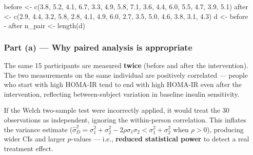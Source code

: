 \documentclass[
  letterpaper,
  DIV=11,
  numbers=noendperiod]{scrartcl}
\newenvironment{Shaded}{\begin{snugshade}}{\end{snugshade}}
\newcommand{\FloatTok}[1]{\textcolor[rgb]{0.68,0.00,0.00}{#1}}
\newcommand{\FunctionTok}[1]{\textcolor[rgb]{0.28,0.35,0.67}{#1}}
\newcommand{\NormalTok}[1]{\textcolor[rgb]{0.00,0.23,0.31}{#1}}
\newcommand{\OtherTok}[1]{\textcolor[rgb]{0.00,0.23,0.31}{#1}}
\newcommand{\SpecialCharTok}[1]{\textcolor[rgb]{0.37,0.37,0.37}{#1}}
\begin{document}
\begin{Shaded}
\begin{Highlighting}[]
\NormalTok{before }\OtherTok{\textless{}{-}} \FunctionTok{c}\NormalTok{(}\FloatTok{3.8}\NormalTok{, }\FloatTok{5.2}\NormalTok{, }\FloatTok{4.1}\NormalTok{, }\FloatTok{6.7}\NormalTok{, }\FloatTok{3.3}\NormalTok{, }\FloatTok{4.9}\NormalTok{, }\FloatTok{5.8}\NormalTok{, }\FloatTok{7.1}\NormalTok{, }\FloatTok{3.6}\NormalTok{, }\FloatTok{4.4}\NormalTok{,}
            \FloatTok{6.0}\NormalTok{, }\FloatTok{5.5}\NormalTok{, }\FloatTok{4.7}\NormalTok{, }\FloatTok{3.9}\NormalTok{, }\FloatTok{5.1}\NormalTok{)}
\NormalTok{after  }\OtherTok{\textless{}{-}} \FunctionTok{c}\NormalTok{(}\FloatTok{2.9}\NormalTok{, }\FloatTok{4.4}\NormalTok{, }\FloatTok{3.2}\NormalTok{, }\FloatTok{5.8}\NormalTok{, }\FloatTok{2.8}\NormalTok{, }\FloatTok{4.1}\NormalTok{, }\FloatTok{4.9}\NormalTok{, }\FloatTok{6.0}\NormalTok{, }\FloatTok{2.7}\NormalTok{, }\FloatTok{3.5}\NormalTok{,}
            \FloatTok{5.0}\NormalTok{, }\FloatTok{4.6}\NormalTok{, }\FloatTok{3.8}\NormalTok{, }\FloatTok{3.1}\NormalTok{, }\FloatTok{4.3}\NormalTok{)}
\NormalTok{d      }\OtherTok{\textless{}{-}}\NormalTok{ before }\SpecialCharTok{{-}}\NormalTok{ after}
\NormalTok{n\_pair }\OtherTok{\textless{}{-}} \FunctionTok{length}\NormalTok{(d)}
\end{Highlighting}
\end{Shaded}

\subsubsection{Part (a) --- Why paired analysis is
appropriate}\label{part-a-why-paired-analysis-is-appropriate}

The same 15 participants are measured \textbf{twice} (before and after
the intervention). The two measurements on the same individual are
positively correlated --- people who start with high HOMA-IR tend to end
with high HOMA-IR even after the intervention, reflecting
between-subject variation in baseline insulin sensitivity.

If the Welch two-sample test were incorrectly applied, it would treat
the 30 observations as independent, ignoring the within-person
correlation. This inflates the variance estimate
(\(\hat{\sigma}_D^2 = \sigma_1^2 + \sigma_2^2 - 2\rho\sigma_1\sigma_2 < \sigma_1^2 + \sigma_2^2\)
when \(\rho > 0\)), producing wider CIs and larger \(p\)-values ---
i.e., \textbf{reduced statistical power} to detect a real treatment
effect.
\end{document}
